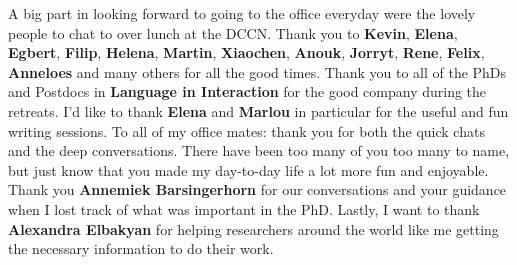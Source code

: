 A big part in looking forward to going to the office everyday were the lovely people to chat to over lunch at the DCCN. Thank you to \textbf{Kevin}, \textbf{Elena}, \textbf{Egbert}, \textbf{Filip}, \textbf{Helena}, \textbf{Martin}, \textbf{Xiaochen}, \textbf{Anouk}, \textbf{Jorryt}, \textbf{Rene}, \textbf{Felix}, \textbf{Anneloes} and many others for all the good times. \newline
Thank you to all of the PhDs and Postdocs in \textbf{Language in Interaction} for the good company during the retreats. I'd like to thank \textbf{Elena} and \textbf{Marlou} in particular for the useful and fun writing sessions. \newline
To all of my office mates: thank you for both the quick chats and the deep conversations. There have been too many of you too many to name, but just know that you made my day-to-day life a lot more fun and enjoyable. \newline
Thank you \textbf{Annemiek Barsingerhorn} for our conversations and your guidance when I lost track of what was important in the PhD. \newline
Lastly, I want to thank \textbf{Alexandra Elbakyan} for helping researchers around the world like me getting the necessary information to do their work. 


